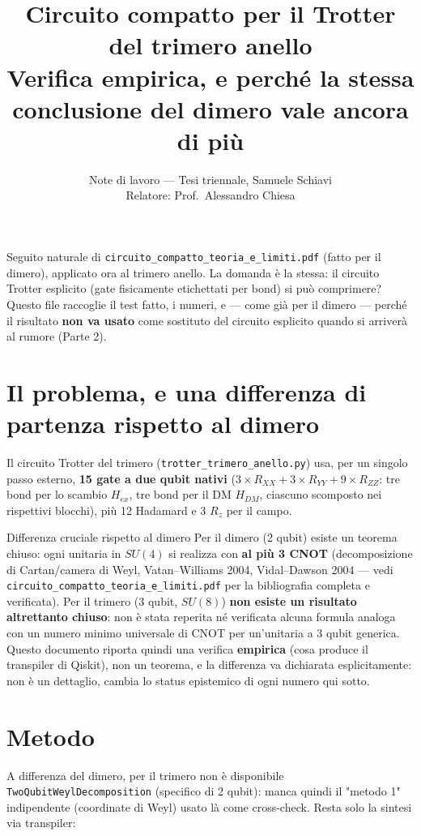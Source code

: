 \documentclass[11pt,a4paper]{article}
\title{\vspace{-1.5em}\color{inkblue}Circuito compatto per il Trotter del trimero anello\\[0.1em]
\Large\normalfont\color{softgray}Verifica empirica, e perché la stessa conclusione del dimero vale ancora di più}
\author{Note di lavoro --- Tesi triennale, Samuele Schiavi\\ Relatore: Prof.\ Alessandro Chiesa}
\date{}
\begin{document}
\sloppy
\maketitle
\thispagestyle{fancy}
\vspace{-2em}

Seguito naturale di \texttt{circuito\_compatto\_teoria\_e\_limiti.pdf} (fatto
per il dimero), applicato ora al trimero anello. La domanda è la stessa: il
circuito Trotter esplicito (gate fisicamente etichettati per bond) si può
comprimere? Questo file raccoglie il test fatto, i numeri, e --- come già
per il dimero --- perché il risultato \textbf{non va usato} come sostituto
del circuito esplicito quando si arriverà al rumore (Parte 2).

\section{Il problema, e una differenza di partenza rispetto al dimero}

Il circuito Trotter del trimero (\texttt{trotter\_trimero\_anello.py}) usa,
per un singolo passo esterno, \textbf{15 gate a due qubit nativi}
($3\times R_{XX}+3\times R_{YY}+9\times R_{ZZ}$: tre bond per lo scambio
$H_{ex}$, tre bond per il DM $H_{DM}$, ciascuno scomposto nei rispettivi
blocchi), più 12 Hadamard e 3 $R_z$ per il campo.

\begin{warnbox}{Differenza cruciale rispetto al dimero}
Per il dimero (2 qubit) esiste un teorema chiuso: ogni unitaria in $SU(4)$
si realizza con \textbf{al più 3 CNOT} (decomposizione di Cartan/camera di
Weyl, Vatan--Williams 2004, Vidal--Dawson 2004 --- vedi
\texttt{circuito\_compatto\_teoria\_e\_limiti.pdf} per la bibliografia
completa e verificata). Per il trimero (3 qubit, $SU(8)$) \textbf{non
esiste un risultato altrettanto chiuso}: non è stata reperita né verificata
alcuna formula analoga con un numero minimo universale di CNOT per
un'unitaria a 3 qubit generica. Questo documento riporta quindi una
verifica \textbf{empirica} (cosa produce il transpiler di Qiskit), non un
teorema, e la differenza va dichiarata esplicitamente: non è un dettaglio,
cambia lo status epistemico di ogni numero qui sotto.
\end{warnbox}

\section{Metodo}

A differenza del dimero, per il trimero non è disponibile
\texttt{TwoQubitWeylDecomposition} (specifico di 2 qubit): manca quindi il
"metodo 1" indipendente (coordinate di Weyl) usato là come cross-check.
Resta solo la sintesi via transpiler:
\end{document}
